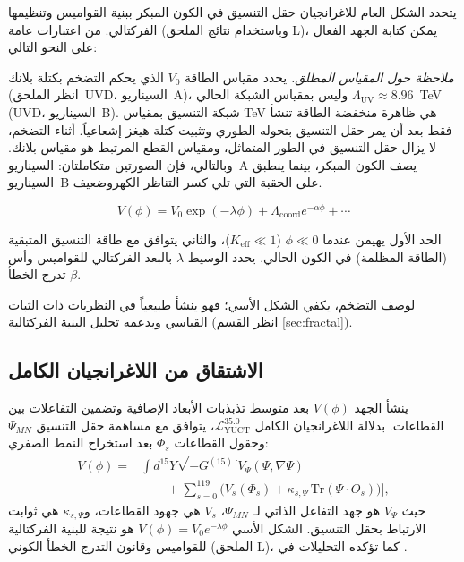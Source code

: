 \documentclass[11pt,a4paper]{article}
\theoremstyle{remark}
\newcommand{\Keff}{K_{\mathrm{eff}}}
\begin{document}
	يتحدد الشكل العام للاغرانجيان حقل التنسيق في الكون المبكر ببنية القواميس وتنظيمها الفركتالي. من اعتبارات عامة (وباستخدام نتائج الملحق L)، يمكن كتابة الجهد الفعال على النحو التالي:
	
	\noindent\textit{ملاحظة حول المقياس المطلق.}
	يحدد مقياس الطاقة $V_0$ الذي يحكم التضخم بكتلة بلانك (انظر الملحق~UVD، السيناريو~A)، وليس بمقياس الشبكة الحالي $\Lambda_{\mathrm{UV}} \approx 8.96$~TeV (UVD، السيناريو~B). شبكة التنسيق بمقياس TeV هي ظاهرة منخفضة الطاقة تنشأ فقط بعد أن يمر حقل التنسيق بتحوله الطوري وتثبيت كتلة هيغز إشعاعياً. أثناء التضخم، لا يزال حقل التنسيق في الطور المتماثل، ومقياس القطع المرتبط هو مقياس بلانك. وبالتالي، فإن الصورتين متكاملتان: السيناريو~A يصف الكون المبكر، بينما ينطبق السيناريو~B على الحقبة التي تلي كسر التناظر الكهروضعيف.
	
	\begin{equation}
		V(\phi) = V_0 \exp\left( -\lambda \phi \right) + \Lambda_{\mathrm{coord}} e^{-\alpha \phi} + \cdots
		\label{eq:potential}
	\end{equation}
	
	الحد الأول يهيمن عندما $\phi \ll 0$ ($\Keff \ll 1$)، والثاني يتوافق مع طاقة التنسيق المتبقية (الطاقة المظلمة) في الكون الحالي. يحدد الوسيط $\lambda$ بالبعد الفركتالي للقواميس وأس تدرج الخطأ $\beta$.
	
	لوصف التضخم، يكفي الشكل الأسي؛ فهو ينشأ طبيعياً في النظريات ذات الثبات القياسي ويدعمه تحليل البنية الفركتالية (انظر القسم \ref{sec:fractal}).
	
	\subsection{الاشتقاق من اللاغرانجيان الكامل}
	
	ينشأ الجهد $V(\phi)$ بعد متوسط تذبذبات الأبعاد الإضافية وتضمين التفاعلات بين القطاعات. بدلالة اللاغرانجيان الكامل $\mathcal{L}_{\text{YUCT}}^{35.0}$، يتوافق مع مساهمة حقل التنسيق $\Psi_{MN}$ وحقول القطاعات $\Phi_s$ بعد استخراج النمط الصفري:
	\begin{align}
		V(\phi) = &\int d^{15}Y \sqrt{-G^{(15)}} \Big[ V_{\Psi}(\Psi,\nabla\Psi) \nonumber\\
		&\qquad + \sum_{s=0}^{119} \big( V_s(\Phi_s) + \kappa_{s,\Psi}\,\mathrm{Tr}(\Psi\cdot O_s) \big) \Big],
	\end{align}
	حيث $V_{\Psi}$ هو جهد التفاعل الذاتي لـ $\Psi_{MN}$، $V_s$ هي جهود القطاعات، و$\kappa_{s,\Psi}$ هي ثوابت الارتباط بحقل التنسيق. الشكل الأسي $V(\phi)=V_0 e^{-\lambda\phi}$ هو نتيجة للبنية الفركتالية للقواميس وقانون التدرج الخطأ الكوني (الملحق L)، كما تؤكده التحليلات في \cite{Yakushev2026}.
	
\end{document}
